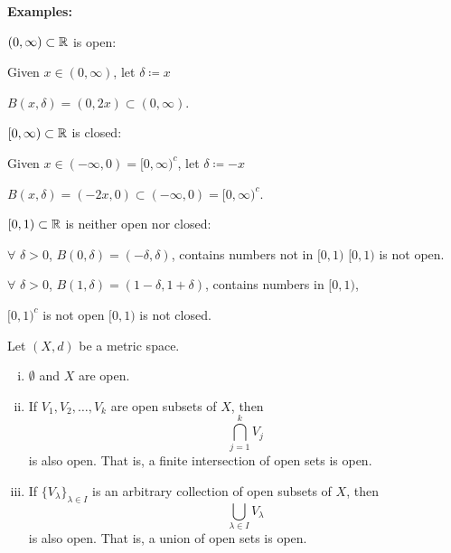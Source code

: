 \documentclass[10pt,aspectratio=169]{beamer}
\begin{document}
\begin{frame}

\textbf{Examples:}

\pause
\medskip

$(0,\infty) \subset {\mathbb{R}}$ is open:

\pause
Given $x \in (0,\infty)$,
let $\delta \coloneqq x$

\pause
\thus \quad
 $B(x,\delta) = (0,2x) \subset (0,\infty)$.

\pause
\medskip

$[0,\infty) \subset {\mathbb{R}}$ is closed:

\pause
Given $x \in (-\infty,0) =
[0,\infty)^c$,
let $\delta \coloneqq -x$

\pause
\thus \quad
 $B(x,\delta) = (-2x,0) \subset
(-\infty,0) = [0,\infty)^c$.

\pause
\medskip

$[0,1) \subset {\mathbb{R}}$ is neither open nor closed:

\pause
$\forall$ $\delta > 0$, $B(0,\delta) = (-\delta,\delta)$, contains numbers
not in $[0,1)$
\pause
\hfill \thus \hfill $[0,1)$ is not open.

\pause
$\forall$ $\delta > 0$,
$B(1,\delta) = (1-\delta,1+\delta)$, contains
numbers in $[0,1)$,

\pause
\thus \quad $[0,1)^c$ is not open \wthus $[0,1)$ is not closed.

\end{frame}

\begin{frame}
\begin{proposition}
Let $(X,d)$ be a metric space.
\begin{enumerate}[(i)]
\item
\pause
\label{topology:openi} $\emptyset$ and $X$ are open.
\item
\pause
\label{topology:openii} If $V_1, V_2, \ldots, V_k$ are open subsets of $X$, then
\begin{equation*}
\bigcap_{j=1}^k V_j
\end{equation*}
is also open.  That is, a finite intersection of open sets is open.
\item
\pause
\label{topology:openiii} If $\{ V_\lambda \}_{\lambda \in I}$ is
an arbitrary collection of open subsets of $X$, then
\begin{equation*}
\bigcup_{\lambda \in I} V_\lambda
\end{equation*}
is also open.  That is, a union of open sets is open.
\end{enumerate}
\end{proposition}


\end{frame}
\end{document}
